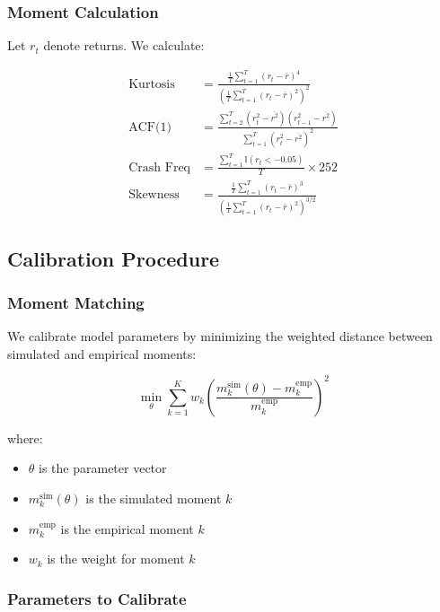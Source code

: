 \subsubsection{Moment Calculation}

Let $r_t$ denote returns. We calculate:

\begin{align}
\text{Kurtosis} &= \frac{\frac{1}{T}\sum_{t=1}^T (r_t - \bar{r})^4}{\left(\frac{1}{T}\sum_{t=1}^T (r_t - \bar{r})^2\right)^2} \\
\text{ACF(1)} &= \frac{\sum_{t=2}^T (r_t^2 - \overline{r^2})(r_{t-1}^2 - \overline{r^2})}{\sum_{t=1}^T (r_t^2 - \overline{r^2})^2} \\
\text{Crash Freq} &= \frac{\sum_{t=1}^T \mathbb{I}(r_t < -0.05)}{T} \times 252 \\
\text{Skewness} &= \frac{\frac{1}{T}\sum_{t=1}^T (r_t - \bar{r})^3}{\left(\frac{1}{T}\sum_{t=1}^T (r_t - \bar{r})^2\right)^{3/2}}
\end{align}

\subsection{Calibration Procedure}

\subsubsection{Moment Matching}

We calibrate model parameters by minimizing the weighted distance between simulated and empirical moments:

\begin{equation}
\min_{\theta} \sum_{k=1}^K w_k \left( \frac{m_k^{\text{sim}}(\theta) - m_k^{\text{emp}}}{m_k^{\text{emp}}} \right)^2
\end{equation}

where:
\begin{itemize}
    \item $\theta$ is the parameter vector
    \item $m_k^{\text{sim}}(\theta)$ is the simulated moment $k$
    \item $m_k^{\text{emp}}$ is the empirical moment $k$
    \item $w_k$ is the weight for moment $k$
\end{itemize}

\subsubsection{Parameters to Calibrate}

